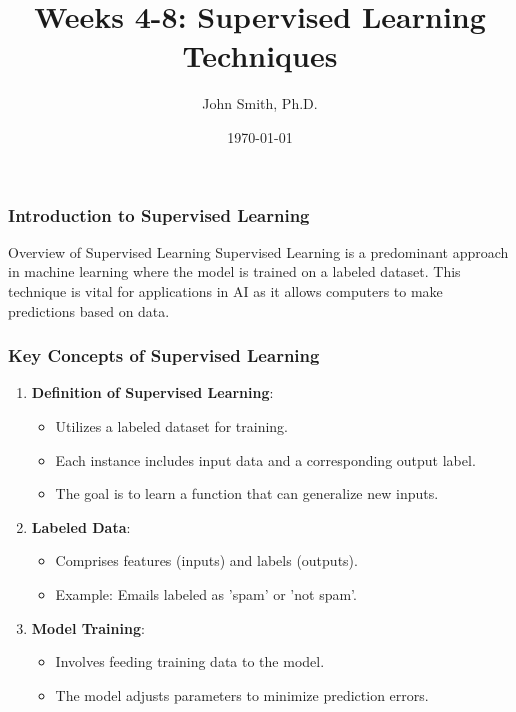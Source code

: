 \documentclass[aspectratio=169]{beamer}
\title[Supervised Learning Techniques]{Weeks 4-8: Supervised Learning Techniques}
\author[J. Smith]{John Smith, Ph.D.}
\institute[University Name]{
  Department of Computer Science\\
  University Name\\
  \vspace{0.3cm}
  Email: email@university.edu\\
  Website: www.university.edu
}
\date{\today}
\begin{document}
\frame{\titlepage}

\begin{frame}[fragile]
    \frametitle{Introduction to Supervised Learning}
    \begin{block}{Overview of Supervised Learning}
        Supervised Learning is a predominant approach in machine learning where the model is trained on a labeled dataset. This technique is vital for applications in AI as it allows computers to make predictions based on data.
    \end{block}
\end{frame}

\begin{frame}[fragile]
    \frametitle{Key Concepts of Supervised Learning}
    \begin{enumerate}
        \item \textbf{Definition of Supervised Learning}: 
            \begin{itemize}
                \item Utilizes a labeled dataset for training.
                \item Each instance includes input data and a corresponding output label.
                \item The goal is to learn a function that can generalize new inputs.
            \end{itemize}
        
        \item \textbf{Labeled Data}: 
            \begin{itemize}
                \item Comprises features (inputs) and labels (outputs).
                \item Example: Emails labeled as 'spam' or 'not spam'.
            \end{itemize}
        
        \item \textbf{Model Training}: 
            \begin{itemize}
                \item Involves feeding training data to the model.
                \item The model adjusts parameters to minimize prediction errors.
            \end{itemize}
    \end{enumerate}
\end{frame}
\end{document}
